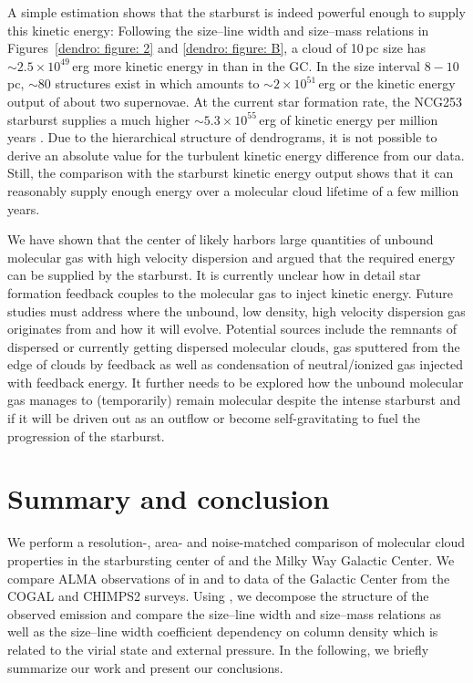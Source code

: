 A simple estimation shows that the starburst is indeed powerful enough to supply this kinetic energy:
Following the size--line width and size--mass relations in Figures~\ref{dendro: figure: 2} and \ref{dendro: figure: B}, a  cloud of 10\,pc size has $\sim 2.5 \times 10^{49}$\,erg more kinetic energy in  than in the GC. In the size interval $8-10$\,pc, $\sim 80$ structures exist in  which amounts to $\sim 2 \times 10^{51}$\,erg or the kinetic energy output of about two supernovae.
At the current star formation rate, the NCG253 starburst supplies a much higher $\sim 5.3 \times 10^{55}$\,erg of kinetic energy per million years \citep{2019ApJ...881...43K}.
Due to the hierarchical structure of dendrograms, it is not possible to derive an absolute value for the turbulent kinetic energy difference from our data. Still, the comparison with the starburst kinetic energy output shows that it can reasonably supply enough energy over a molecular cloud lifetime of a few million years.

We have shown that the center of  likely harbors large quantities of unbound molecular gas with high velocity dispersion and argued that the required energy can be supplied by the starburst. 
It is currently unclear how in detail star formation feedback couples to the molecular gas to inject kinetic energy. 
Future studies must address where the unbound, low density, high velocity dispersion gas originates from and how it will evolve. Potential sources include the remnants of dispersed or currently getting dispersed molecular clouds, gas sputtered from the edge of clouds by feedback as well as condensation of neutral/ionized gas injected with feedback energy.
It further needs to be explored how the unbound molecular gas manages to (temporarily) remain molecular despite the intense starburst and if it will be driven out as an outflow or become self-gravitating to fuel the progression of the starburst.



\section{Summary and conclusion}
\label{dendro: section: summary}

We perform a resolution-, area- and noise-matched comparison of molecular cloud properties in the starbursting center of  and the Milky Way Galactic Center. We compare ALMA observations of  in  and  to data of the Galactic Center from the COGAL and CHIMPS2 surveys. Using \astrodendro, we decompose the structure of the observed emission and compare the size--line width and size--mass relations as well as the size--line width coefficient dependency on column density which is related to the virial state and external pressure.
In the following, we briefly summarize our work and present our conclusions.

